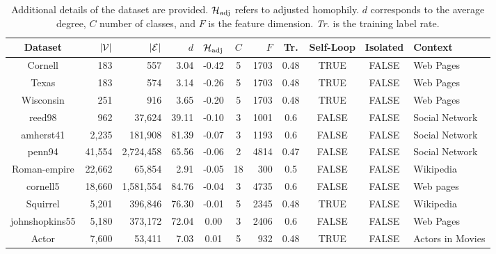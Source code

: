 \begin{table}[!htbp]
\caption{Additional details of the dataset are provided. ${\mathcal{H}}_\mathrm{adj}$ refers to adjusted homophily. $d$ corresponds to the average degree, $C$ number of classes, and $F$ is the feature dimension. \textit{Tr.} is the training label rate.}
\label{tab:datasetdescription}
\centering
\begin{sc}
\resizebox{1.0\linewidth}{!}
{
\def\arraystretch{1.0}
\begin{tabular}{@{}crrrccrcccl@{}}
\toprule
\textbf{Dataset} &
  $|{\mathcal{V}}|$ &
  $|{\mathcal{E}}|$ &
  \textbf{$d$} &
  \textbf{${\mathcal{H}}_\mathrm{adj}$} &
  \textbf{$C$} &
  \textbf{$F$} &
  \textbf{Tr.} &
  \textbf{Self-Loop} &
  \textbf{Isolated} &
  \textbf{Context} \\ \midrule
Cornell        & 183       & 557         & 3.04   & -0.42 & 5  & 1703 & 0.48 & TRUE  & FALSE & Web Pages           \\
Texas          & 183       & 574         & 3.14   & -0.26 & 5  & 1703 & 0.48 & TRUE  & FALSE & Web Pages           \\
Wisconsin      & 251       & 916         & 3.65   & -0.20 & 5  & 1703 & 0.48 & TRUE  & FALSE & Web Pages           \\
reed98         & 962       & 37,624      & 39.11  & -0.10 & 3  & 1001 & 0.6  & FALSE & FALSE & Social Network      \\
amherst41      & 2,235     & 181,908     & 81.39  & -0.07 & 3  & 1193 & 0.6  & FALSE & FALSE & Social Network      \\
penn94         & 41,554    & 2,724,458   & 65.56  & -0.06 & 2  & 4814 & 0.47 & FALSE & FALSE & Social Network      \\
Roman-empire   & 22,662    & 65,854      & 2.91   & -0.05 & 18 & 300  & 0.5  & FALSE & FALSE & Wikipedia           \\
cornell5       & 18,660    & 1,581,554   & 84.76  & -0.04 & 3  & 4735 & 0.6  & FALSE & FALSE & Web pages           \\
Squirrel       & 5,201     & 396,846     & 76.30  & -0.01 & 5  & 2345 & 0.48 & TRUE  & FALSE & Wikipedia           \\
johnshopkins55 & 5,180     & 373,172     & 72.04  & 0.00  & 3  & 2406 & 0.6  & FALSE & FALSE & Web Pages           \\
Actor          & 7,600     & 53,411      & 7.03   & 0.01  & 5  & 932  & 0.48 & TRUE  & FALSE & Actors in Movies    \\

\end{tabular}}
\end{sc}
\end{table}
